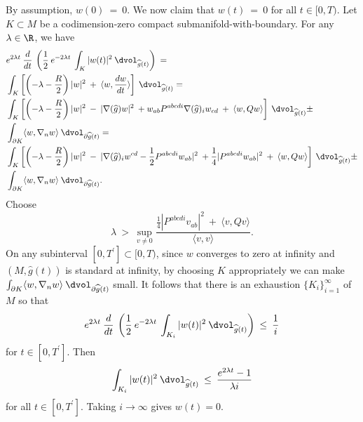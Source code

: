 By assumption, $w(0) \: = \: 0$. We now claim that $w(t) \: = \: 0$
for all $t \in [0, T)$.
Let $K \subset M$ be a codimension-zero compact submanifold-with-boundary.
For any $\lambda \in \R$, we have
\begin{align}
& e^{2\lambda t} \: \frac{d}{dt} \: \left( \frac{1}{2} \: e^{-2\lambda t} \:
\int_K |w(t)|^2 \: \dvol_{\widehat{g}(t)} \right) \:  = \\
& \int_K \left[ \left( -\lambda - \frac{R}{2} \right) |w|^2 \: + \:
\langle w, \frac{dw}{dt} \rangle \right] \: \dvol_{\widehat{g}(t)} = \notag \\
&
\int_K \left[ \left( -\lambda - \frac{R}{2} \right) |w|^2 \: - \:
|\nabla(\widehat{g}) w|^2 \: +
w_{ab} P^{abcdi} \nabla(\widehat{g})_i w_{cd} \: + \:
\langle w,  Q w \rangle \right] \: \dvol_{\widehat{g}(t)}
\pm \notag \\
& \int_{\partial K} \langle w, \nabla_n w \rangle \:
\dvol_{\partial \widehat{g}(t)} = \notag \\
& \int_K \left[ \left( -\lambda - \frac{R}{2} \right) |w|^2 \: - \:
|\nabla(\widehat{g})_i w^{cd} - \frac{1}{2} P^{abcdi} w_{ab}|^2 \:
+ \frac{1}{4} |P^{abcdi} w_{ab}|^2 \: + \:
\langle w,  Q w \rangle \right] \: \dvol_{\widehat{g}(t)} \pm \notag \\
& \int_{\partial K} \langle w, \nabla_n w \rangle
\: \dvol_{\partial \widehat{g}(t)}. \notag
\end{align}
Choose
\begin{equation}
\lambda \: > \: \sup_{v \neq 0} \frac{
\frac{1}{4} |P^{abcdi} v_{ab}|^2 \: + \:
\langle v,  Q v \rangle
}{\langle v, v \rangle}.
\end{equation}
On any subinterval $[0, T^\prime] \subset [0, T)$, since
$w$ converges to zero at infinity
and $(M, \widehat{g}(t))$
is standard at infinity, by choosing $K$ appropriately we can make
$\int_{\partial K} \langle w, \nabla_n w \rangle
\: \dvol_{\partial \widehat{g}(t)}$ small.
It follows that there is an exhaustion
$\{K_i\}_{i=1}^\infty$ of $M$ so that
\begin{equation}
e^{2\lambda t} \: \frac{d}{dt} \: \left( \frac{1}{2} \: e^{-2\lambda t} \:
\int_{K_i} |w(t)|^2 \: \dvol_{\widehat{g}(t)} \right) \: \le \:
\frac{1}{i}
\end{equation}
for $t \in [0, T^\prime]$.
Then
\begin{equation}
\int_{K_i} |w(t)|^2 \: \dvol_{\widehat{g}(t)} \: \le \:
\frac{e^{2\lambda t}-1}{\lambda i}
\end{equation}
for all $t \in [0, T^\prime]$.
Taking $i \rightarrow \infty$ gives $w(t) = 0$.

